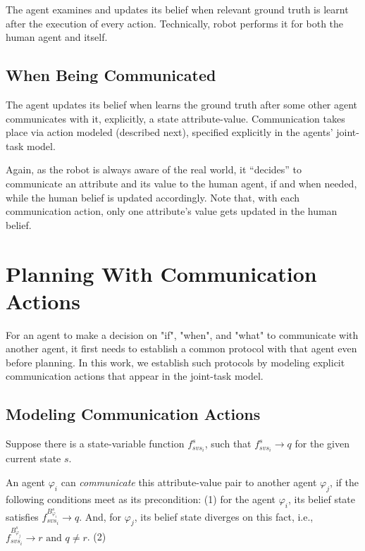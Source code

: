 \documentclass[letterpaper]{article} %
\begin{document}
The agent examines and updates its belief when relevant ground truth is learnt after the execution of every action. Technically, robot performs it for both the human agent and itself.

\subsection{When Being Communicated}
The agent updates its belief when learns the ground truth after some other agent communicates with it, explicitly, a state attribute-value. 
Communication takes place via action modeled (described next), specified explicitly in the agents' joint-task model.

Again, as the robot is always aware of the real world, it ``decides'' to communicate  an attribute and its value to the human agent, if and when needed, while the human belief is updated accordingly. Note that, with each communication action, only one attribute's value gets updated in the human belief.


\section{Planning With Communication Actions}
For an agent to make a decision on "if", "when", and "what" to communicate with another agent, it first needs to establish a common protocol with that agent even before planning.  
In this work, we establish such protocols by modeling explicit communication actions that appear in the joint-task model.

\subsection{Modeling Communication Actions}
Suppose there is a state-variable function $f_{svs_i}^s$, such that $f_{svs_i}^{s} \rightarrow q$ for the given current state $s$.

An agent $\varphi_i$ can \textit{communicate} this attribute-value pair to another agent $\varphi_j$, if the following conditions meet as its precondition: 
(1) for the agent $\varphi_i$, its belief state satisfies $f_{svs_i}^{B_{\varphi_i}^s} \rightarrow q$. And, for $\varphi_j$, its belief state diverges on this fact, i.e., $f_{svs_i}^{B_{\varphi_j}^s} \rightarrow r \text{ and } q \neq r$. 
(2) 
\end{document}

